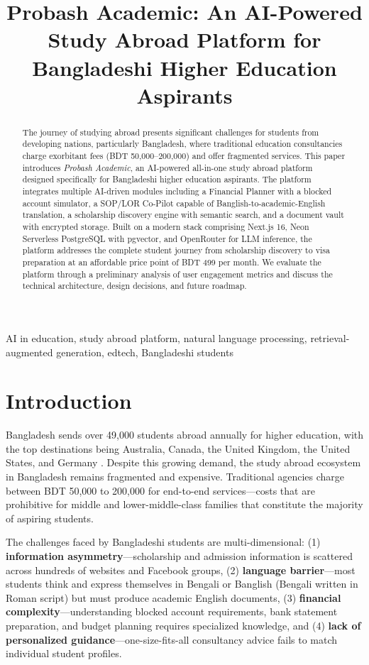 \documentclass[conference]{IEEEtran}
\title{Probash Academic: An AI-Powered Study Abroad Platform for Bangladeshi Higher Education Aspirants}
\author{
    \IEEEauthorblockN{Abdullah Al Mahmud Adib}
    \IEEEauthorblockA{
        Department of Computer Science and Engineering\\
        \textit{Independent University, Bangladesh}\\
        Dhaka, Bangladesh\\
        aamadib53@gmail.com
    }
}
\begin{document}
\maketitle

\begin{abstract}
The journey of studying abroad presents significant challenges for students from developing nations, particularly Bangladesh, where traditional education consultancies charge exorbitant fees (BDT 50,000--200,000) and offer fragmented services. This paper introduces \textit{Probash Academic}, an AI-powered all-in-one study abroad platform designed specifically for Bangladeshi higher education aspirants. The platform integrates multiple AI-driven modules including a Financial Planner with a blocked account simulator, a SOP/LOR Co-Pilot capable of Banglish-to-academic-English translation, a scholarship discovery engine with semantic search, and a document vault with encrypted storage. Built on a modern stack comprising Next.js 16, Neon Serverless PostgreSQL with pgvector, and OpenRouter for LLM inference, the platform addresses the complete student journey from scholarship discovery to visa preparation at an affordable price point of BDT 499 per month. We evaluate the platform through a preliminary analysis of user engagement metrics and discuss the technical architecture, design decisions, and future roadmap.
\end{abstract}

\begin{IEEEkeywords}
AI in education, study abroad platform, natural language processing, retrieval-augmented generation, edtech, Bangladeshi students
\end{IEEEkeywords}

\section{Introduction}
\label{sec:introduction}

Bangladesh sends over 49,000 students abroad annually for higher education, with the top destinations being Australia, Canada, the United Kingdom, the United States, and Germany \cite{unesco2023}. Despite this growing demand, the study abroad ecosystem in Bangladesh remains fragmented and expensive. Traditional agencies charge between BDT 50,000 to 200,000 for end-to-end services—costs that are prohibitive for middle and lower-middle-class families that constitute the majority of aspiring students.

The challenges faced by Bangladeshi students are multi-dimensional: (1) \textbf{information asymmetry}—scholarship and admission information is scattered across hundreds of websites and Facebook groups, (2) \textbf{language barrier}—most students think and express themselves in Bengali or Banglish (Bengali written in Roman script) but must produce academic English documents, (3) \textbf{financial complexity}—understanding blocked account requirements, bank statement preparation, and budget planning requires specialized knowledge, and (4) \textbf{lack of personalized guidance}—one-size-fits-all consultancy advice fails to match individual student profiles.
\end{document}
